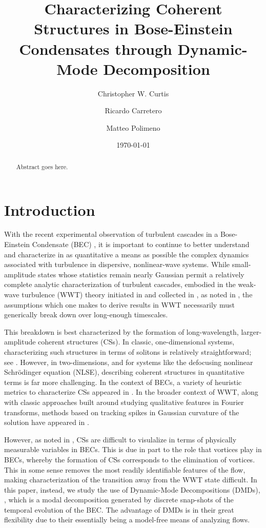 \documentclass[aps,prl,preprint,groupedaddress]{revtex4-1}
\begin{document}
\author{Christopher W. Curtis}
\author{Ricardo Carretero}
\author{Matteo Polimeno}
\date{\today}
\title{Characterizing Coherent Structures in Bose-Einstein Condensates through Dynamic-Mode Decomposition}

\begin{abstract}
Abstract goes here.
\end{abstract}
\maketitle
\section*{Introduction}
With the recent experimental observation of turbulent cascades in a Bose-Einstein Condensate (BEC) \cite{navon}, it is important to continue to better understand and characterize in as quantitative a means as possible the complex dynamics associated with turbulence in dispersive, nonlinear-wave systems.  While small-amplitude states whose statistics remain nearly Gaussian permit a relatively complete analytic characterization of turbulent cascades, embodied in the weak-wave turbulence (WWT) theory initiated in \cite{zakharov} and collected in \cite{nazarenko}, as noted in \cite{newell,cai}, the assumptions which one makes to derive results in WWT necessarily must generically break down over long-enough timescales.  

This breakdown is best characterized by the formation of long-wavelength, larger-amplitude coherent structures (CSs).  In classic, one-dimensional systems, characterizing such structures in terms of solitons is relatively straightforward; see \cite{cai}.  However, in two-dimensions, and for systems like the defocusing nonlinear Schr\"{o}dinger equation (NLSE), describing coherent structures in quantitative terms is far more challenging.  In the context of BECs, a variety of heuristic metrics to characterize CSs appeared in \cite{nazarenko2}.  In the broader context of WWT, along with classic approaches built around studying qualitative features in Fourier transforms, methods based on tracking spikes in Gaussian curvature of the solution have appeared in \cite{mordant}.  

However, as noted in \cite{nazarenko2}, CSs are difficult to visulalize in terms of physically measurable variables in BECs.  This is due in part to the role that vortices play in BECs, whereby the formation of CSs corresponds to the elimination of vortices.  This in some sense removes the most readily identifiable features of the flow, making characterization of the transition away from the WWT state difficult.  In this paper, instead, we study the use of Dynamic-Mode Decompositions (DMDs), \cite{schmid,williams,kutz}, which is a modal decomposition generated by discrete snap-shots of the temporal evolution of the BEC.  The advantage of DMDs is in their great flexibility due to their essentially being a model-free means of analyzing flows.  
\end{document}

